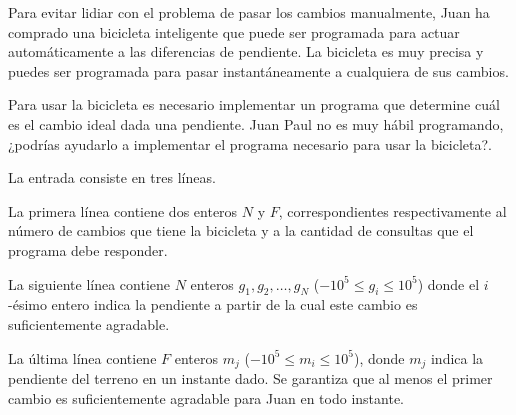 \documentclass{oci}
\begin{document}
\begin{problemDescription}
Para evitar lidiar con el problema de pasar los cambios manualmente, Juan ha
comprado una bicicleta inteligente que puede ser programada para actuar
automáticamente a las diferencias de pendiente.
La bicicleta es muy precisa y puedes ser programada para pasar instantáneamente
a cualquiera de sus cambios.

Para usar la bicicleta es necesario implementar un programa que determine cuál
es el cambio ideal dada una pendiente.
Juan Paul no es muy hábil programando, ¿podrías ayudarlo a implementar el
programa necesario para usar la bicicleta?.

\end{problemDescription}

\begin{inputDescription}
La entrada consiste en tres líneas.

La primera línea contiene dos enteros $N$ y $F$, correspondientes
respectivamente al número de cambios que tiene la bicicleta y a la cantidad
de consultas que el programa debe responder.

La siguiente línea contiene $N$ enteros $g_1,g_2,\ldots, g_N$ ($-10^5\leq
g_i\leq 10^5$) donde el $i$-ésimo entero indica la pendiente a partir de la cual
este cambio es suficientemente agradable.

La última línea contiene $F$ enteros $m_j$ ($-10^5\leq m_i\leq 10^5$), donde
$m_j$ indica la pendiente del terreno en un instante dado.
Se garantiza que al menos el primer cambio es suficientemente agradable para
Juan en todo instante.
\end{inputDescription}
\end{document}
